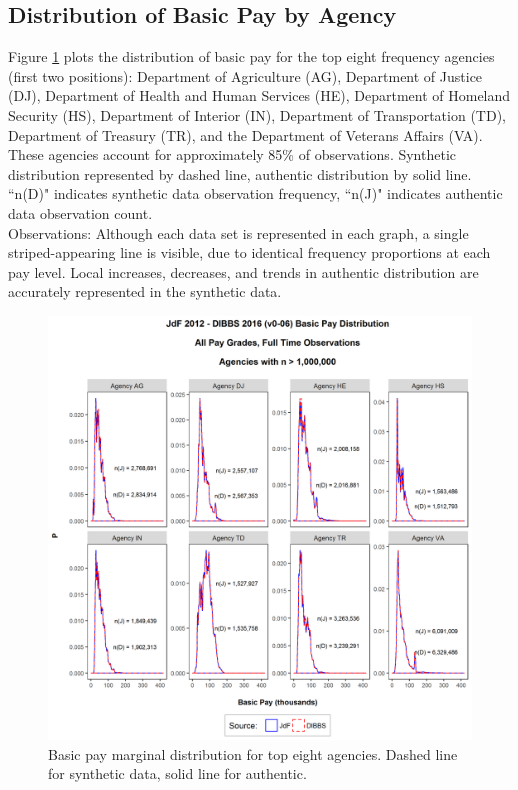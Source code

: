 \documentclass[10pt, letterpaper]{article}
\begin{document}
\begin{spacing}{1.0}
\subsection{Distribution of Basic Pay by Agency}

Figure \ref{figure:JdFDIBBSBasicPayDistribution} plots the distribution of basic pay for the top eight frequency agencies (first two positions):  Department of Agriculture (AG), Department of Justice (DJ), Department of Health and Human Services (HE), Department of Homeland Security (HS), Department of Interior (IN), Department of Transportation (TD), Department of Treasury (TR), and the Department of Veterans Affairs (VA).  These agencies account for approximately 85\% of observations.  Synthetic distribution represented by dashed line, authentic distribution by solid line.  ``n(D)" indicates synthetic data observation frequency, ``n(J)" indicates authentic data observation count.\\

Observations:  Although each data set is represented in each graph, a single striped-appearing line is visible, due to identical frequency proportions at each pay level.  Local increases, decreases, and trends in authentic distribution are accurately represented in the synthetic data.\\

\begin{figure}[h]
    \centering
    \includegraphics[width=6in, trim={0 0.8in 0 1.2in}, clip]{JdFDIBBSBasicPayDistribution.png}
    \caption{Basic pay marginal distribution for top eight agencies.  Dashed line for synthetic data, solid line for authentic.}
    \label{figure:JdFDIBBSBasicPayDistribution}
\end{figure}


\end{spacing}
\end{document}
